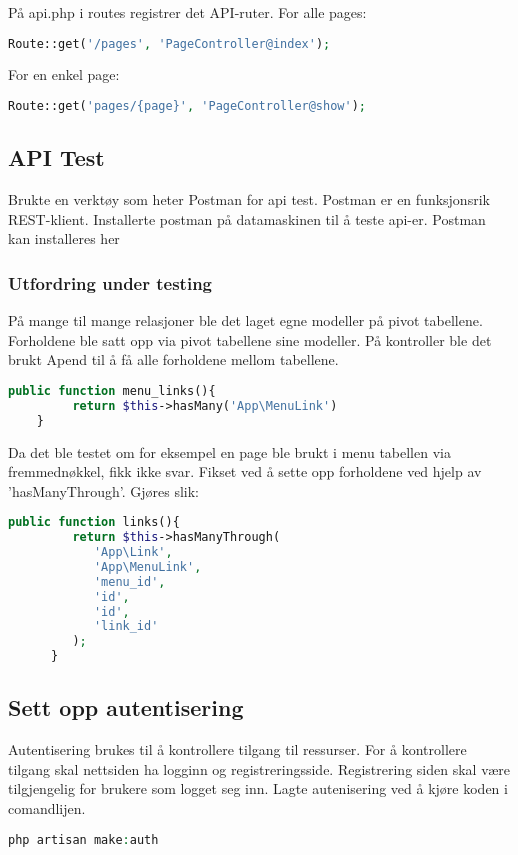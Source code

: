 På api.php i routes\cite{laravel2019r} registrer det API-ruter.
For alle pages:
\begin{lstlisting}[language=PHP]
    Route::get('/pages', 'PageController@index');
\end{lstlisting}
For en enkel page:
\begin{lstlisting}[language=PHP]
    Route::get('pages/{page}', 'PageController@show');
\end{lstlisting}

\subsection{API Test}
Brukte en verktøy som heter Postman for api test. Postman er en funksjonsrik REST-klient\cite{Rathod2017ITP}. Installerte postman på datamaskinen til å teste api-er. Postman kan installeres her\cite{postman2019tocap}
\subsubsection{Utfordring under testing}
På mange til mange relasjoner ble  det laget egne modeller på pivot tabellene.
Forholdene ble satt opp via pivot tabellene sine modeller. På kontroller ble det brukt  Apend til å få alle forholdene mellom tabellene.
\begin{lstlisting}[language=PHP]
    public function menu_links(){
         return $this->hasMany('App\MenuLink')
    }
\end{lstlisting}
Da det ble testet om for eksempel en page ble brukt i menu tabellen via fremmednøkkel, fikk ikke svar.
Fikset ved å sette opp forholdene ved hjelp av 'hasManyThrough'. Gjøres slik:
\begin{lstlisting}[language=PHP]
    public function links(){
         return $this->hasManyThrough(
            'App\Link',
            'App\MenuLink',
            'menu_id',
            'id',
            'id',
            'link_id'
         );
      }
\end{lstlisting}

\subsection{Sett opp autentisering}
Autentisering brukes til å kontrollere tilgang til ressurser. For å kontrollere tilgang skal nettsiden ha logginn og registreringsside. Registrering siden skal være tilgjengelig for brukere som logget seg inn.
Lagte autenisering ved å kjøre koden i comandlijen.
\begin{lstlisting}[language=PHP]
    php artisan make:auth
\end{lstlisting}

